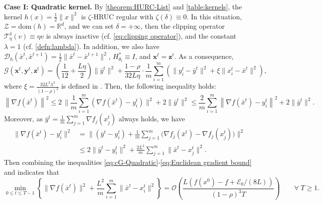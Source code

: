 \documentclass{article}
\theoremstyle{plain}
\theoremstyle{definition}
\theoremstyle{remark}
\newcommand{\clip}{\mathcal{T}^\delta_\eta}
\newcommand{\sL}{L}
\newcommand{\cO}{\mathcal O}
\newcommand{\cE}{\mathcal E}
\newcommand{\cZ}{\mathcal{Z}}
\newcommand{\cD}{\mathcal{D}_{h}}
\newcommand{\bx}{\mathbf{x}}
\newcommand{\by}{\mathbf{y}}
\newcommand{\bz}{\mathbf{z}}
\newcommand{\dom}[1]{\mathrm{dom}(#1)}
\begin{document}
\noindent\textbf{Case I: Quadratic kernel.} By \cref{theorem:HURC-List} and \cref{table:kernels}, the kernel $h(x) = \frac{1}{2}\|x\|^2$ is $\zeta$-HRUC regular with $\zeta(\delta)\equiv0$. In this situation, $\cZ=\dom{h} = \mathbb{R}^d$, and we can set $\delta=+\infty$, then the clipping operator $\clip(v) \equiv \eta v$ is always inactive (cf. \eqref{eq:clipping operator}), and the constant $\lambda = 1$ (cf. \eqref{defn:lambda}). In addition, we also have $\cD(\bar{x}^t,\bar{x}^{t+1}) = \frac{1}{2}\|\bar{x}^t-\bar{x}^{t+1}\|^2$, $H^*_{\theta_t}\equiv I$, and $\bx^t = \bz^t$. As a consequence,  
\begin{equation}
\label{eq:cG-Quadratic}
\mathcal{G}(\bx^t,\by^t,\bz^t) = \left(\frac{1}{12}+\frac{\sL\eta}{2}\right)\|\bar{y}^t\|^2 + \frac{1-\rho}{32\sL\eta}\cdot\frac{1}{m}{\sum}_{i=1}^m\left(\|y_i^t-\bar{y}^t\|^2 + \xi\|x_i^t-\bar{x}^t\|^2\right),    
\end{equation} 
where $\xi = \frac{32\sL^2\lambda^2}{(1-\rho)^2}$ is defined in . Then, the following inequality holds: 
\begin{equation}\label{eq:Euclidean s bound}
\left\|\nabla f(\bar x^t)\right\|^2 
    \leq 2\, \Big\|\frac{1}{m}{\sum}_{i=1}^m (\nabla f(\bar x^t) - y^t_i)\Big\|^2 + 2\|\bar{y}^t\|^2 \leq \frac{2}{m}{\sum}_{i=1}^m \left\|\nabla f(\bar x^t) - y^t_i\right\|^2 + 2\|\bar{y}^t\|^2.
\end{equation} 
Moreover, as $\bar y^t=\frac{1}{m}\sum_{j=1}^m \nabla f_j(x_j^t)$ always holds, we have 
\begin{equation}\label{eq:Euclidean gradient bound}
\begin{aligned}
\|\nabla f(\bar x^t) - y_i^t\|^2 
    & =  \Big\|(\bar y^t - y_i^t)+ \frac1m{\sum}_{j=1}^m \big(\nabla f_j(\bar x^t) - \nabla f_j(x_j^t) \big)  \Big\|^2 \\
    & \leq  2\| \bar y^t - y_i^t \|^2 + \frac{2\sL^2}{m}{\sum}_{j=1}^m \|\bar x^t-x_j^t\|^2. 
\end{aligned}
\end{equation}
Then combining the inequalities \eqref{eq:cG-Quadratic}-\eqref{eq:Euclidean gradient bound} and  indicates that 
$$\min_{0\leq t\leq T-1}\left\{\|\nabla f(\bar{x}^{t})\|^2 + \frac{\sL^2}{m}{\sum}_{i=1}^m\|\bar{x}^t-x_i^t\|^2\right\} = \cO\left(\frac{\sL(f(x^0)- \underline{f}{}+\cE_0/(8\sL))}{(1-\rho)^{3}T}\right) \qquad\forall\; T\geq 1.$$
\end{document}
